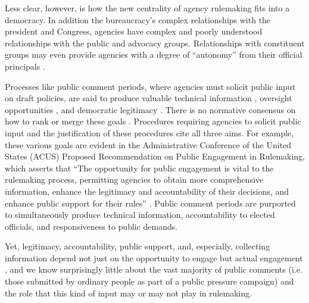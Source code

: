 Less clear, however, is how the new centrality of agency rulemaking fits into a democracy. In addition the bureaucracy's complex relationships with the president and Congress, agencies have complex and poorly understood relationships with the public and advocacy groups. Relationships with constituent groups may even provide agencies with a degree of ``autonomy'' from their official principals \citep{Carpenter2001}. %

Processes like public comment periods, where agencies must solicit public input on draft policies, are said to produce valuable technical information \citep{Yackee2006JPART, Nelson2012}, oversight opportunities \citep{Balla1998, Mccubbins1984}, and democratic legitimacy \citep{Croley2003, Rosenbloom2003}. There is no normative consensus on how to rank or merge these goals \citep{Wilson1967, Wilson1989, Carrigan2017}. Procedures requiring agencies to solicit public input and the justification of these procedures cite all three aims. For example, these various goals are evident in the Administrative Conference of the United States (ACUS) Proposed Recommendation on Public Engagement in Rulemaking, which asserts that ``The opportunity for public engagement is vital to the rulemaking process, permitting agencies to obtain more comprehensive information, enhance the legitimacy and accountability of their decisions, and enhance public support for their rules'' \citep{ACUS2018}. Public comment periods are purported to simultaneously produce technical information, accountability to elected officials, and responsiveness to public demands.

Yet, legitimacy, accountability, public support, and, especially, collecting information depend not just on the opportunity to engage but actual engagement \citep{Herz2018}, and we know surprisingly little about the vast majority of public comments (i.e. those submitted by ordinary people as part of a public pressure campaign) and the role that this kind of input may or may not play in rulemaking.


